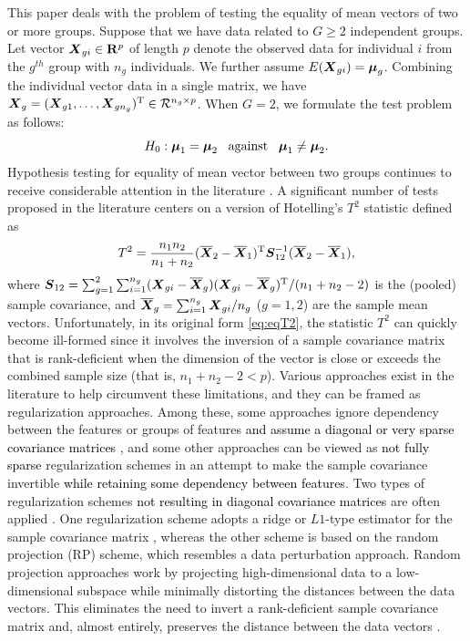 \documentclass[alpha-refs]{wiley-article}
\theoremstyle{plain}%
\theoremstyle{definition}
\def\be{\begin{eqnarray}}
\def\ee{\end{eqnarray}}
\def\trans{^{\rm T}}
\newcommand{\uS}       {\mbox{\boldmath$S$}}
\newcommand{\uX}       {\mbox{\boldmath$X$}}
\newcommand{\umu}               {\mbox{\boldmath$\mu$}}
\begin{document}
This paper deals with the problem of testing the equality of mean vectors of two or more groups. Suppose that we have data related to $G \geq 2$ independent groups. Let vector $\uX_{gi} \in \mathbf{R}^{p}$ of length $p$ denote the observed data for individual $i$ from the $g^{th}$ group with $n_{g}$ individuals. We further assume $E(\uX_{gi}) = \umu_g$.  
Combining the individual vector data in a single matrix, we have $\uX_{g} = (\uX_{g1}, \ldots, \uX_{gn_g})\trans \in \mathcal{R}^{n_g \times p}$. When $G=2$, we formulate the test problem as follows:
$$ H_{0}: \umu_1 = \umu_2\;\;\;\mbox{against}\;\;\;  \umu_1 \neq \umu_2.  $$
Hypothesis testing for equality of mean vector between two groups continues to receive considerable attention in the literature \citep{zhang2019more, chen2019two}. A significant number of tests proposed in the literature centers on a version of Hotelling's $T^2$ statistic defined as
\be
T^{2} = \frac{n_1n_2}{n_1 + n_2}(\overline{\uX}_2 - \overline{\uX}_1)\trans\uS^{-1}_{12} (\overline{\uX}_2 - \overline{\uX}_1), \label{eq:eqT2}
\ee
where $\uS_{12} = \sum^{2}_{g=1}\sum^{n_g}_{i=1}(\uX_{gi} - \overline{\uX}_g)(\uX_{gi} - \overline{\uX}_g)\trans /(n_1+n_2 - 2)$ is the (pooled) sample covariance, and $\overline{\uX}_g = \sum^{n_g}_{i=1}\uX_{gi}/n_g$ ($g = 1,2$) are the sample mean vectors.
Unfortunately, in its original form \eqref{eq:eqT2}, the statistic $T^2$ can quickly become ill-formed since it involves the inversion of a sample covariance matrix that is rank-deficient when the dimension of the vector is close or exceeds the combined sample size (that is, $n_1+n_2-2 < p$). Various approaches exist in the literature to help circumvent these limitations, and they can be framed as regularization approaches. Among these, some approaches ignore dependency between the features or groups of features \textcolor{black}{and assume a diagonal or very sparse covariance matrices} \citep{bai1996effect,chen2010two,ahmad2014u,feng2017composite}, and some other approaches can be viewed as \textcolor{black}{not fully sparse} regularization schemes in an attempt to make the sample covariance invertible \textcolor{black}{while retaining some dependency between features}. Two types of regularization schemes \textcolor{black}{not resulting in diagonal covariance matrices} are often applied \citep{hu2020pairwise}. One regularization scheme adopts a ridge or $L1$-type estimator for the sample covariance matrix \citep{chen2011regularized,li2020adaptable}, whereas the other scheme is based on the random projection (RP) scheme, which resembles a data perturbation approach. Random projection approaches work by projecting high-dimensional data to a low-dimensional subspace while minimally distorting the distances between the data vectors. This eliminates the need to invert a rank-deficient sample covariance matrix and, almost entirely, preserves the distance between the data vectors \citep{johnson84extensionslipschitz}. 
\end{document}
